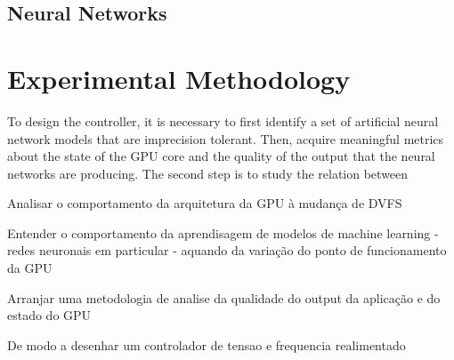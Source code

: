 \subsection{Neural Networks}
\label{section:solarch}

\section{Experimental Methodology}

To design the controller, it is necessary to first identify a set of artificial neural network models that are imprecision tolerant. Then, acquire meaningful metrics about the state of the GPU core and the quality of the output that the neural networks are producing. The second step is to study the relation between 

Analisar o comportamento da arquitetura da GPU à mudança de DVFS

Entender o comportamento da aprendisagem de modelos de machine learning - redes neuronais em particular - aquando da variação do ponto de funcionamento da GPU

Arranjar uma metodologia de analise da qualidade do output da aplicação e do estado do GPU

De modo a desenhar um controlador de tensao e frequencia realimentado 